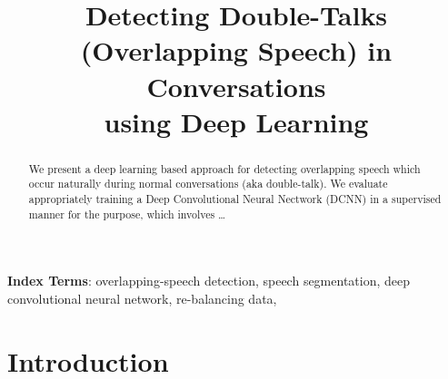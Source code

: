 \documentclass[a4paper]{article}
\title{
       Detecting Double-Talks (Overlapping Speech) in Conversations\\
       using Deep Learning
}
\begin{document}
\maketitle

\newcommand{\outline}[1]{}  %
\newcommand{\widom}[1]{}  %

\begin{abstract}
\widom{
       - the problem,
       - the approach and solutions
       - the main contributions of the paper.
       - little if any background and motivation. address the experts.
       - factual but comprehensive.
}

We present a deep learning based approach for detecting overlapping speech which occur naturally during normal conversations (aka double-talk).
We evaluate appropriately training a Deep Convolutional Neural Nectwork (DCNN) in a supervised manner for the purpose,
which involves \ldots

\end{abstract}

\noindent\textbf{Index Terms}:
overlapping-speech detection,
speech segmentation,
deep convolutional neural network,
re-balancing data,

\section{Introduction}
\widom{
       - What is the problem?
       - Why is it interesting and important?
       - Why is it hard? (E.g., why do naive approaches fail?)
       - Why hasn't it been solved before? Or,
       - What's wrong with other solutions? How does mine differ?
       - What are the key components of my approach and results?
       - Any specific limitations of my approach?
       - Short yet detailed enough `Related Works` near the end, or make it as Section 2.
       - `Summary of Contributions` as the final para or subsection.
              - List the major contributions in bullet form,
              - Mention in which sections they can be found, doubling up as an outline.
}
\end{document}
